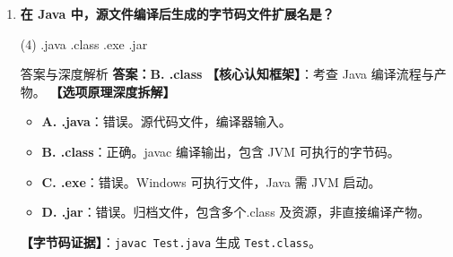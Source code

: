 ﻿\documentclass[12pt, a4paper]{ctexart}
\newcommand{\code}[1]{\texttt{#1}}
\begin{document}
\begin{enumerate}[label=\textbf{\arabic*.}, itemsep=1em]
\begin{bluebox}{答案与深度解析}
		      \textbf{【命题趋势与实战策略】}
		      \begin{itemize}[leftmargin=*, nosep]
			      \item \textbf{考场秒杀}：见到“多继承”选它，Java 类不支持
			      \item \textbf{高频陷阱}：接口多实现常被误认为类多继承
		      \end{itemize}
	      \end{bluebox}

	\item \textbf{在 Java 中，源文件编译后生成的字节码文件扩展名是？}
	      \begin{tasks}(4)
		      \task .java \task .class \task .exe \task .jar
	      \end{tasks}
	      \begin{bluebox}{答案与深度解析}
		      \textbf{答案：B. .class}
		      \textbf{【核心认知框架】}：考查 Java 编译流程与产物。
		      \textbf{【选项原理深度拆解】}
		      \begin{itemize}[leftmargin=*, nosep]
			      \item \textbf{A. .java}：错误。源代码文件，编译器输入。
			      \item \textbf{B. .class}：正确。javac 编译输出，包含 JVM 可执行的字节码。
			      \item \textbf{C. .exe}：错误。Windows 可执行文件，Java 需 JVM 启动。
			      \item \textbf{D. .jar}：错误。归档文件，包含多个.class 及资源，非直接编译产物。
		      \end{itemize}
		      \textbf{【字节码证据】}：\code{javac Test.java} 生成 \code{Test.class}。
	      \end{bluebox}


\end{enumerate}
\end{document}
